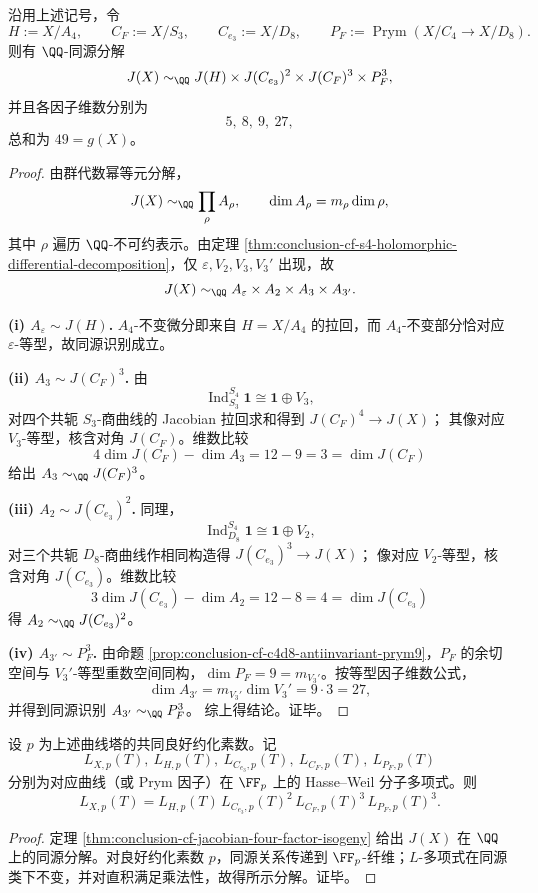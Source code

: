 \begin{theorem}\label{thm:conclusion-cf-jacobian-four-factor-isogeny}
沿用上述记号，令
\[
H:=X/A_4,\qquad
C_F:=X/S_3,\qquad
C_{e_3}:=X/D_8,\qquad
P_F:=\operatorname{Prym}(X/C_4\to X/D_8).
\]
则有 \(\QQ\)-同源分解
\[
J(X)\sim_{\QQ}
J(H)\times J(C_{e_3})^{2}\times J(C_F)^{3}\times P_F^{3},
\]
并且各因子维数分别为
\[
5,\ 8,\ 9,\ 27,
\]
总和为 \(49=g(X)\)。
\end{theorem}
\begin{proof}
由群代数幂等元分解，
\[
J(X)\sim_{\QQ}\prod_{\rho}A_{\rho},
\qquad
\dim A_{\rho}=m_{\rho}\dim\rho,
\]
其中 \(\rho\) 遍历 \(\QQ\)-不可约表示。由定理 \ref{thm:conclusion-cf-s4-holomorphic-differential-decomposition}，仅
\(\varepsilon,V_2,V_3,V_3'\) 出现，故
\[
J(X)\sim_{\QQ}A_{\varepsilon}\times A_2\times A_3\times A_{3'}.
\]

\textbf{(i) \(A_{\varepsilon}\sim J(H)\).}
\(A_4\)-不变微分即来自 \(H=X/A_4\) 的拉回，而 \(A_4\)-不变部分恰对应 \(\varepsilon\)-等型，故同源识别成立。

\textbf{(ii) \(A_3\sim J(C_F)^3\).}
由
\[
\operatorname{Ind}_{S_3}^{S_4}\mathbf 1\cong \mathbf 1\oplus V_3,
\]
对四个共轭 \(S_3\)-商曲线的 Jacobian 拉回求和得到
\(
J(C_F)^4\to J(X)
\)；
其像对应 \(V_3\)-等型，核含对角 \(J(C_F)\)。维数比较
\[
4\dim J(C_F)-\dim A_3=12-9=3=\dim J(C_F)
\]
给出
\(
A_3\sim_{\QQ}J(C_F)^3
\)。

\textbf{(iii) \(A_2\sim J(C_{e_3})^2\).}
同理，
\[
\operatorname{Ind}_{D_8}^{S_4}\mathbf 1\cong \mathbf 1\oplus V_2,
\]
对三个共轭 \(D_8\)-商曲线作相同构造得
\(
J(C_{e_3})^3\to J(X)
\)；
像对应 \(V_2\)-等型，核含对角 \(J(C_{e_3})\)。维数比较
\[
3\dim J(C_{e_3})-\dim A_2=12-8=4=\dim J(C_{e_3})
\]
得
\(
A_2\sim_{\QQ}J(C_{e_3})^2
\)。

\textbf{(iv) \(A_{3'}\sim P_F^3\).}
由命题 \ref{prop:conclusion-cf-c4d8-antiinvariant-prym9}，\(P_F\) 的余切空间与 \(V_3'\)-等型重数空间同构，\(\dim P_F=9=m_{V_3'}\)。按等型因子维数公式，
\[
\dim A_{3'}=m_{V_3'}\dim V_3'=9\cdot 3=27,
\]
并得到同源识别
\(
A_{3'}\sim_{\QQ}P_F^3
\)。
综上得结论。证毕。
\end{proof}

\begin{corollary}\label{cor:conclusion-cf-hasse-weil-factorization}
设 \(p\) 为上述曲线塔的共同良好约化素数。记
\[
L_{X,p}(T),\ L_{H,p}(T),\ L_{C_{e_3},p}(T),\ L_{C_F,p}(T),\ L_{P_F,p}(T)
\]
分别为对应曲线（或 Prym 因子）在 \(\FF_p\) 上的 Hasse--Weil 分子多项式。则
\[
L_{X,p}(T)
=
L_{H,p}(T)\,
L_{C_{e_3},p}(T)^2\,
L_{C_F,p}(T)^3\,
L_{P_F,p}(T)^3.
\]
\end{corollary}
\begin{proof}
定理 \ref{thm:conclusion-cf-jacobian-four-factor-isogeny} 给出 \(J(X)\) 在 \(\QQ\) 上的同源分解。对良好约化素数 \(p\)，同源关系传递到 \(\FF_p\)-纤维；\(L\)-多项式在同源类下不变，并对直积满足乘法性，故得所示分解。证毕。
\end{proof}

